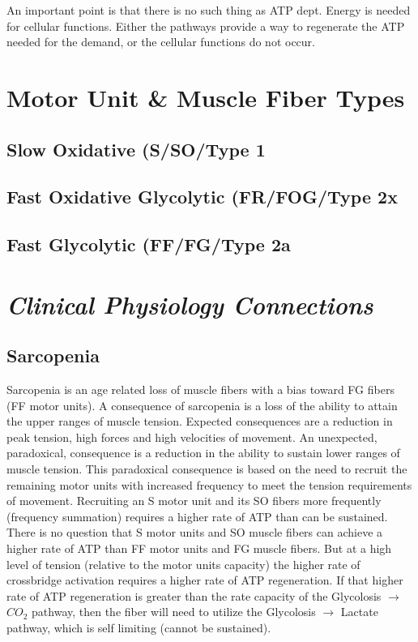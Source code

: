 An important point is that there is no such thing as ATP dept. Energy is needed for cellular functions. Either the pathways provide a way to regenerate the ATP needed for the demand, or the cellular functions do not occur.


\section{Motor Unit \& Muscle Fiber Types}

\subsection{Slow Oxidative (S/SO/Type 1}

\subsection{Fast Oxidative Glycolytic (FR/FOG/Type 2x}

\subsection{Fast Glycolytic (FF/FG/Type 2a}




\section{\textit{Clinical Physiology Connections}}

\subsection{Sarcopenia}

Sarcopenia is an age related loss of muscle fibers with a bias toward FG fibers (FF motor units). A consequence of sarcopenia is a loss of the ability to attain the upper ranges of muscle tension. Expected consequences are a reduction in peak tension, high forces and high velocities of movement. An unexpected, paradoxical, consequence is a reduction in the ability to sustain lower ranges of muscle tension. This paradoxical consequence is based on the need to recruit the remaining motor units with increased frequency to meet the tension requirements of movement. Recruiting an S motor unit and its SO fibers more frequently (frequency summation) requires a higher rate of ATP than can be sustained. There is no question that S motor units and SO muscle fibers can achieve a higher rate of ATP than FF motor units and FG muscle fibers. But at a high level of tension (relative to the motor units capacity) the higher rate of crossbridge activation requires a higher rate of ATP regeneration. If that higher rate of ATP regeneration is greater than the rate capacity of the Glycolosis $\rightarrow$ $CO_2$ pathway, then the fiber will need to utilize the Glycolosis $\rightarrow$ Lactate pathway, which is self limiting (cannot be sustained). 

